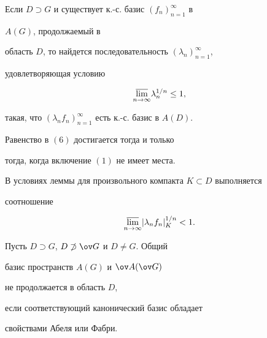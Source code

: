  


\begin{lem} 


Если $D\supset G$ и существует к.-с. базис $(f_n)^\infty_{n=1}$ в 


$A(G)$, продолжаемый в 


область $D$, то найдется последовательность $(\lambda_n)^\infty_{n=1}$, 


удовлетворяющая условию 


\begin{equation} 


\underset{n\to\infty}{\varlimsup}{}\lambda^{1/n}_n\le1, 


\end{equation} 


такая, что $(\lambda_n f_n)^\infty_{n=1}$ есть к.-с. базис в $A(D)$. 


Равенство в $(6)$ достигается тогда и только 


тогда, когда включение $(1)$ не имеет места. 


\end{lem} 


 


\begin{cornonum} 


В условиях леммы для произвольного компакта $K\subset D$ выполняется 


соотношение 


\begin{equation} 


\underset{n\to\infty}{\varlimsup}{}|\lambda_n f_n|^{1/n}_K<1. 


\end{equation} 


\end{cornonum} 


 


\begin{thm} Пусть $D\supset G$, $D\not\supset\ov G$ и $D\ne G$. Общий 


базис пространств $A(G)$ и $\ov A(\ov G)$ 


не продолжается в область $D$, 


если соответствующий канонический базис обладает 


свойствами Абеля или Фабри. 


\end{thm} 


